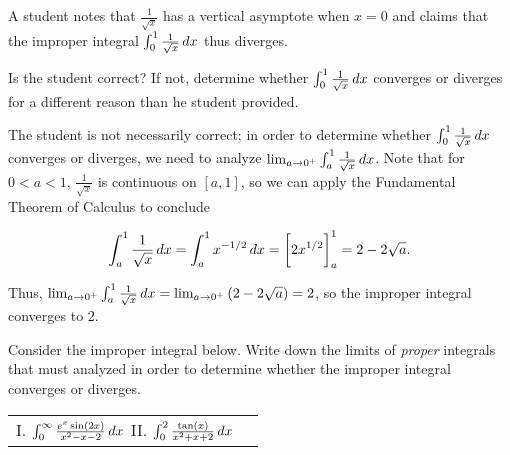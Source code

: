 \documentclass[handout]{ximera}
\begin{document}
\begin{problem}
A student notes that $\frac{1}{\sqrt{x}}$ has a vertical asymptote when $x=0$ and claims that the improper integral $\int_0^1 \frac{1}{\sqrt{x}} \mathop{}\!d x$ thus diverges.  


Is the student correct?  If not, determine whether $\int_0^1 \frac{1}{\sqrt{x}} \mathop{}\!d x$ converges or diverges for a different reason than he student provided.
\end{problem}

\begin{freeResponse}
The student is not necessarily correct; in order to determine whether $\int_0^1 \frac{1}{\sqrt{x}} \mathop{}\!d x$ converges or diverges, we need to analyze $\lim_{a \to 0^+} \int_a^1 \frac{1}{\sqrt{x}} \mathop{}\!d x$.  Note that for $0<a<1$, $\frac{1}{\sqrt{x}}$ is continuous on $[a,1]$, so we can apply the Fundamental Theorem of Calculus to conclude

\[
\int_a^1 \frac{1}{\sqrt{x}} \mathop{}\!d x = \int_a^1 x^{-1/2} \mathop{}\!d x = \bigg[ 2x^{1/2} \bigg]_a^1 = 2-2\sqrt{a}.
\]

Thus, $\lim_{a \to 0^+} \int_a^1 \frac{1}{\sqrt{x}} \mathop{}\!d x = \lim_{a \to 0^+} \left(2- 2\sqrt{a}\right) =2$, so the improper integral converges to $2$.
\end{freeResponse}

\begin{problem}
Consider the improper integral below.  Write down the limits of \emph{proper} integrals that must analyzed in order to determine whether the improper integral converges or diverges.

\begin{center}
\begin{tabular}{ll}
I. $\int_0^{\infty} \frac{e^x\sin(2x)}{x^2-x-2} \mathop{}\!d x$ \hspace{.5in} II. $\int_0^2 \frac{\tan(x)}{x^2+x+2} \mathop{}\!d x$
\end{tabular}
\end{center}
\end{problem}
\end{document}
